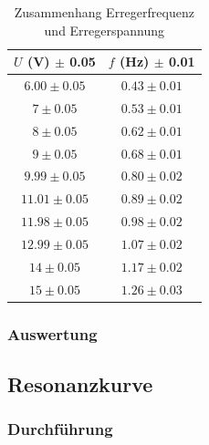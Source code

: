 \documentclass{article}
\begin{document}
\begin{table}[!htb]
    \centering
    \begin{tabular}{|c|c|}
    \hline
    $U$ (V) $\pm$ 0.05 & $f$ (Hz) $\pm$ 0.01 \\
    \hline
    $6.00 \pm 0.05$ & $0.43 \pm 0.01$ \\
    $7 \pm 0.05$ & $0.53 \pm 0.01$ \\
    $8 \pm 0.05$ & $0.62 \pm 0.01$ \\
    $9 \pm 0.05$ & $0.68 \pm 0.01$ \\
    $9.99 \pm 0.05$ & $0.80 \pm 0.02$ \\
    $11.01 \pm 0.05$ & $0.89 \pm 0.02$ \\
    $11.98 \pm 0.05$ & $0.98 \pm 0.02$ \\
    $12.99 \pm 0.05$ & $1.07 \pm 0.02$ \\
    $14 \pm 0.05$ & $1.17 \pm 0.02$ \\
    $15 \pm 0.05$ & $1.26 \pm 0.03$ \\
    \hline
    \end{tabular}
    \caption{Zusammenhang Erregerfrequenz und Erregerspannung}
    \label{tab:erregerfrequenz_spannung}
\end{table}

\subsubsection{Auswertung}

\subsection{Resonanzkurve}
\subsubsection{Durchführung}
\end{document}
